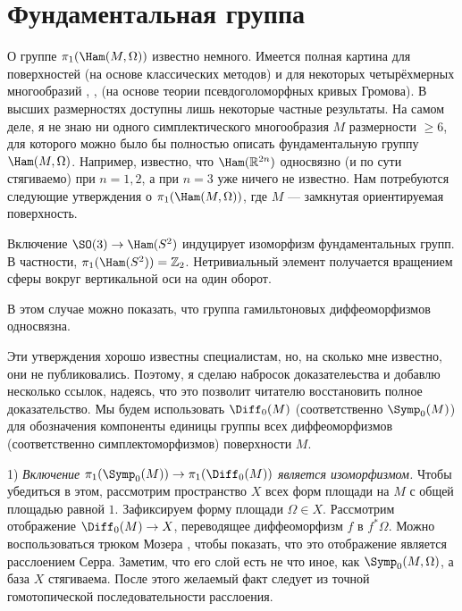 \section{Фундаментальная группа}

О группе $\pi_1 (\Ham (M, \Omega))$ известно немного.
Имеется полная картина для поверхностей (на основе классических
методов) и для некоторых четырёхмерных многообразий \cite{G1},
\cite{A}, \cite{AM} (на основе теории псевдоголоморфных кривых
Громова). 
В высших размерностях доступны лишь некоторые частные результаты.
На самом деле, я не знаю ни одного симплектического многообразия $M$
размерности $\ge 6$, для которого можно было бы полностью описать
фундаментальную группу $\Ham (M, \Omega)$. 
Например, известно, что $\Ham (\RR^{2n})$ односвязно (и по сути
стягиваемо) при $n = 1, 2$, а при $n = 3$ уже ничего не известно. 
Нам потребуются следующие утверждения о $\pi_1 (\Ham (M, \Omega))$,
где $M$ — замкнутая ориентируемая поверхность. 

\begin{ex}{}\label{7.2.A}
Включение $\SO(3) \z\to \Ham(S^2)$ индуцирует изоморфизм фундаментальных групп.
В частности, $\pi_1 (\Ham (S^2))\z=\ZZ_2$.
Нетривиальный элемент получается вращением сферы вокруг вертикальной
оси на один оборот. 
\end{ex}

\begin{ex}{}
\label{7.2.B}
В этом случае можно показать, что группа гамильтоновых диффеоморфизмов
односвязна. 
\end{ex}


Эти утверждения хорошо известны специалистам, но, на сколько мне известно,
они не публиковались.
Поэтому, я сделаю набросок доказателеьства и добавлю несколько ссылок,
надеясь, что это позволит читателю восстановить полное доказательство.
Мы будем использовать $\Diff_0 (M)$ (соответственно $\Symp_0 (M)$) для
обозначения компоненты единицы группы всех диффеоморфизмов
(соответственно симплектоморфизмов) поверхности $M$. 


1) \textit{Включение $\pi_1 (\Symp_0 (M)) \to \pi_1 (\Diff_0 (M))$ является
изоморфизмом.}
Чтобы убедиться в этом, рассмотрим пространство $X$ всех форм площади
на $M$ с общей площадью равной $1$. 
Зафиксируем форму площади $\Omega \in X$.
Рассмотрим отображение $\Diff_0 (M) \to X$, переводящее диффеоморфизм
$f$ в $f^\ast \Omega$. 
Можно воспользоваться трюком Мозера \cite[p. 94--95]{MS}, чтобы
показать, что это отображение является расслоением Серра. 
Заметим, что его слой есть не что иное, как $\Symp_0 (M, \Omega)$, а
база $X$ стягиваема. 
После этого желаемый факт следует из точной гомотопической
последовательности расслоения. 

